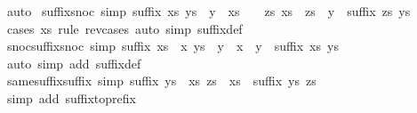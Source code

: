 \begin{isabellebody}
\ auto%
\endisatagproof
{\isafoldproof}%
%
\isadelimproof
\isanewline
%
\endisadelimproof
\isanewline
{}\isamarkupfalse%
\ suffix{\isacharunderscore}snoc\ {\isacharbrackleft}simp{\isacharbrackright}{\isacharcolon}\ {\isachardoublequoteopen}suffix\ xs\ {\isacharparenleft}ys\ {\isacharat}\ {\isacharbrackleft}y{\isacharbrackright}{\isacharparenright}\ {\isasymlongleftrightarrow}\ xs\ {\isacharequal}\ {\isacharbrackleft}{\isacharbrackright}\ {\isasymor}\ {\isacharparenleft}{\isasymexists}zs{\isachardot}\ xs\ {\isacharequal}\ zs\ {\isacharat}\ {\isacharbrackleft}y{\isacharbrackright}\ {\isasymand}\ suffix\ zs\ ys{\isacharparenright}{\isachardoublequoteclose}\isanewline
%
\isadelimproof
\ \ %
\endisadelimproof
%
\isatagproof
{}\isamarkupfalse%
\ {\isacharparenleft}cases\ xs\ rule{\isacharcolon}\ rev{\isacharunderscore}cases{\isacharparenright}\ {\isacharparenleft}auto\ simp{\isacharcolon}\ suffix{\isacharunderscore}def{\isacharparenright}%
\endisatagproof
{\isafoldproof}%
%
\isadelimproof
\isanewline
%
\endisadelimproof
\isanewline
{}\isamarkupfalse%
\ snoc{\isacharunderscore}suffix{\isacharunderscore}snoc\ {\isacharbrackleft}simp{\isacharbrackright}{\isacharcolon}\ {\isachardoublequoteopen}suffix\ {\isacharparenleft}xs\ {\isacharat}\ {\isacharbrackleft}x{\isacharbrackright}{\isacharparenright}\ {\isacharparenleft}ys\ {\isacharat}\ {\isacharbrackleft}y{\isacharbrackright}{\isacharparenright}\ {\isacharequal}\ {\isacharparenleft}x\ {\isacharequal}\ y\ {\isasymand}\ suffix\ xs\ ys{\isacharparenright}{\isachardoublequoteclose}\isanewline
%
\isadelimproof
\ \ %
\endisadelimproof
%
\isatagproof
{}\isamarkupfalse%
\ {\isacharparenleft}auto\ simp\ add{\isacharcolon}\ suffix{\isacharunderscore}def{\isacharparenright}%
\endisatagproof
{\isafoldproof}%
%
\isadelimproof
\isanewline
%
\endisadelimproof
\isanewline
{}\isamarkupfalse%
\ same{\isacharunderscore}suffix{\isacharunderscore}suffix\ {\isacharbrackleft}simp{\isacharbrackright}{\isacharcolon}\ {\isachardoublequoteopen}suffix\ {\isacharparenleft}ys\ {\isacharat}\ xs{\isacharparenright}\ {\isacharparenleft}zs\ {\isacharat}\ xs{\isacharparenright}\ {\isacharequal}\ suffix\ ys\ zs{\isachardoublequoteclose}\isanewline
%
\isadelimproof
\ \ %
\endisadelimproof
%
\isatagproof
{}\isamarkupfalse%
\ {\isacharparenleft}simp\ add{\isacharcolon}\ suffix{\isacharunderscore}to{\isacharunderscore}prefix{\isacharparenright}%
\endisatagproof
{\isafoldproof}%
%
\isadelimproof
\isanewline
%
\endisadelimproof
\isanewline
{}\isamarkupfalse%

\end{isabellebody}
